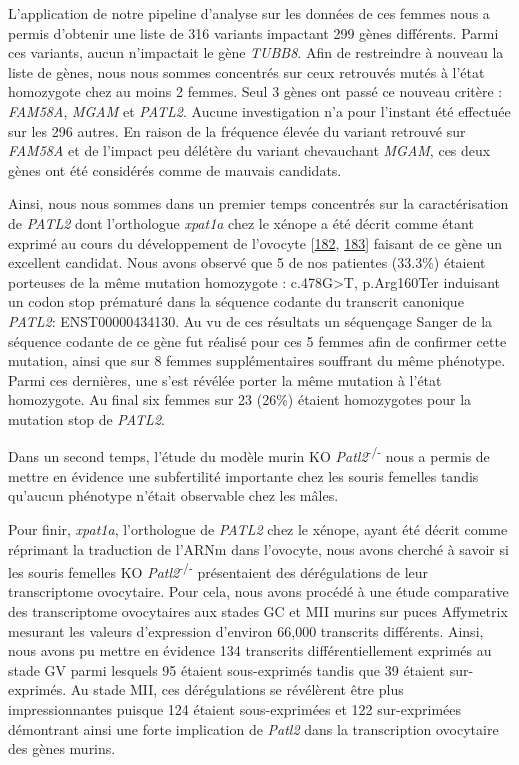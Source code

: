 \documentclass[12pt,a4paper,twoside]{ugathesis}
\theoremstyle{definition}
\theoremstyle{definition}
\theoremstyle{definition}
\theoremstyle{remark}
\begin{document}
L'application de notre pipeline d'analyse sur les données de ces femmes
nous a permis d'obtenir une liste de 316 variants impactant 299 gènes
différents. Parmi ces variants, aucun n'impactait le gène \emph{TUBB8}.
Afin de restreindre à nouveau la liste de gènes, nous nous sommes
concentrés sur ceux retrouvés mutés à l'état homozygote chez au moins 2
femmes. Seul 3 gènes ont passé ce nouveau critère : \emph{FAM58A},
\emph{MGAM} et \emph{PATL2}. Aucune investigation n'a pour l'instant été
effectuée sur les 296 autres. En raison de la fréquence élevée du
variant retrouvé sur \emph{FAM58A} et de l'impact peu délétère du
variant chevauchant \emph{MGAM}, ces deux gènes ont été considérés comme
de mauvais candidats.

Ainsi, nous nous sommes dans un premier temps concentrés sur la
caractérisation de \emph{PATL2} dont l'orthologue \emph{xpat1a} chez le
xénope a été décrit comme étant exprimé au cours du développement de
l'ovocyte {[}\protect\hyperlink{ref-Marnef2010}{182},
\protect\hyperlink{ref-Nakamura2010}{183}{]} faisant de ce gène un
excellent candidat. Nous avons observé que 5 de nos patientes (33.3\%)
étaient porteuses de la même mutation homozygote :
c.478G\textgreater{}T, p.Arg160Ter induisant un codon stop prématuré
dans la séquence codante du transcrit canonique \emph{PATL2}:
ENST00000434130. Au vu de ces résultats un séquençage Sanger de la
séquence codante de ce gène fut réalisé pour ces 5 femmes afin de
confirmer cette mutation, ainsi que sur 8 femmes supplémentaires
souffrant du même phénotype. Parmi ces dernières, une s'est révélée
porter la même mutation à l'état homozygote. Au final six femmes sur 23
(26\%) étaient homozygotes pour la mutation stop de \emph{PATL2}.

Dans un second temps, l'étude du modèle murin KO
\emph{Patl2}\textsuperscript{-/-} nous a permis de mettre en évidence
une subfertilité importante chez les souris femelles tandis qu'aucun
phénotype n'était observable chez les mâles.

Pour finir, \emph{xpat1a}, l'orthologue de \emph{PATL2} chez le xénope,
ayant été décrit comme réprimant la traduction de l'ARNm dans l'ovocyte,
nous avons cherché à savoir si les souris femelles KO
\emph{Patl2}\textsuperscript{-/-} présentaient des dérégulations de leur
transcriptome ovocytaire. Pour cela, nous avons procédé à une étude
comparative des transcriptome ovocytaires aux stades GC et MII murins
sur puces Affymetrix mesurant les valeurs d'expression d'environ 66,000
transcrits différents. Ainsi, nous avons pu mettre en évidence 134
transcrits différentiellement exprimés au stade GV parmi lesquels 95
étaient sous-exprimés tandis que 39 étaient sur-exprimés. Au stade MII,
ces dérégulations se révélèrent être plus impressionnantes puisque 124
étaient sous-exprimées et 122 sur-exprimées démontrant ainsi une forte
implication de \emph{Patl2} dans la transcription ovocytaire des gènes
murins.
\end{document}
